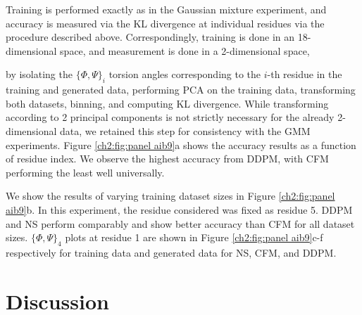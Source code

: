 Training is performed exactly as in the Gaussian mixture experiment, and accuracy is measured via the KL divergence at individual residues via the procedure described above. Correspondingly, training is done in an 18-dimensional space, and measurement is done in a 2-dimensional space, {by isolating the $\{ \Phi,\Psi \}_i$ torsion angles corresponding to the $i$-th residue in the training and generated data, performing PCA on the training data, transforming both datasets, binning, and computing KL divergence. While transforming according to 2 principal components is not strictly necessary for the already 2-dimensional data, we retained this step for consistency with the GMM experiments. Figure \ref{ch2:fig:panel aib9}a shows the accuracy results as a function of residue index. We observe the highest accuracy from DDPM, with CFM performing the least well universally.

We show the results of varying training dataset sizes in Figure \ref{ch2:fig:panel aib9}b. In this experiment, the residue considered was fixed as residue 5. DDPM and NS perform comparably and show better accuracy than CFM for all dataset sizes. $\{ \Phi,\Psi \}_4$ plots at residue 1 are shown in Figure \ref{ch2:fig:panel aib9}c-f respectively for training data and generated data for NS, CFM, and DDPM.

\section{Discussion}
\label{ch2:sec:discussion}

}
